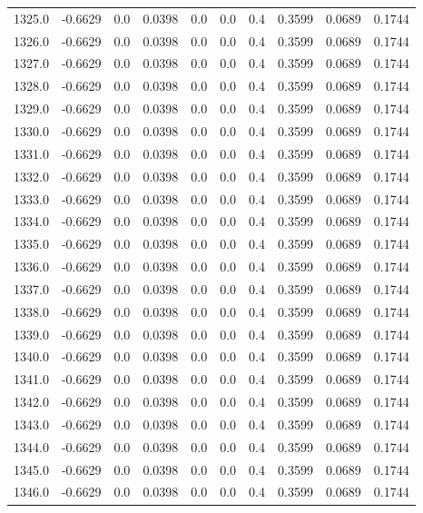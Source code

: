 \begin{longtable}{lrrrrrrrrr}
1325.0 & -0.6629 & 0.0 & 0.0398 & 0.0 & 0.0 & 0.4 & 0.3599 & 0.0689 & 0.1744 \\
1326.0 & -0.6629 & 0.0 & 0.0398 & 0.0 & 0.0 & 0.4 & 0.3599 & 0.0689 & 0.1744 \\
1327.0 & -0.6629 & 0.0 & 0.0398 & 0.0 & 0.0 & 0.4 & 0.3599 & 0.0689 & 0.1744 \\
1328.0 & -0.6629 & 0.0 & 0.0398 & 0.0 & 0.0 & 0.4 & 0.3599 & 0.0689 & 0.1744 \\
1329.0 & -0.6629 & 0.0 & 0.0398 & 0.0 & 0.0 & 0.4 & 0.3599 & 0.0689 & 0.1744 \\
1330.0 & -0.6629 & 0.0 & 0.0398 & 0.0 & 0.0 & 0.4 & 0.3599 & 0.0689 & 0.1744 \\
1331.0 & -0.6629 & 0.0 & 0.0398 & 0.0 & 0.0 & 0.4 & 0.3599 & 0.0689 & 0.1744 \\
1332.0 & -0.6629 & 0.0 & 0.0398 & 0.0 & 0.0 & 0.4 & 0.3599 & 0.0689 & 0.1744 \\
1333.0 & -0.6629 & 0.0 & 0.0398 & 0.0 & 0.0 & 0.4 & 0.3599 & 0.0689 & 0.1744 \\
1334.0 & -0.6629 & 0.0 & 0.0398 & 0.0 & 0.0 & 0.4 & 0.3599 & 0.0689 & 0.1744 \\
1335.0 & -0.6629 & 0.0 & 0.0398 & 0.0 & 0.0 & 0.4 & 0.3599 & 0.0689 & 0.1744 \\
1336.0 & -0.6629 & 0.0 & 0.0398 & 0.0 & 0.0 & 0.4 & 0.3599 & 0.0689 & 0.1744 \\
1337.0 & -0.6629 & 0.0 & 0.0398 & 0.0 & 0.0 & 0.4 & 0.3599 & 0.0689 & 0.1744 \\
1338.0 & -0.6629 & 0.0 & 0.0398 & 0.0 & 0.0 & 0.4 & 0.3599 & 0.0689 & 0.1744 \\
1339.0 & -0.6629 & 0.0 & 0.0398 & 0.0 & 0.0 & 0.4 & 0.3599 & 0.0689 & 0.1744 \\
1340.0 & -0.6629 & 0.0 & 0.0398 & 0.0 & 0.0 & 0.4 & 0.3599 & 0.0689 & 0.1744 \\
1341.0 & -0.6629 & 0.0 & 0.0398 & 0.0 & 0.0 & 0.4 & 0.3599 & 0.0689 & 0.1744 \\
1342.0 & -0.6629 & 0.0 & 0.0398 & 0.0 & 0.0 & 0.4 & 0.3599 & 0.0689 & 0.1744 \\
1343.0 & -0.6629 & 0.0 & 0.0398 & 0.0 & 0.0 & 0.4 & 0.3599 & 0.0689 & 0.1744 \\
1344.0 & -0.6629 & 0.0 & 0.0398 & 0.0 & 0.0 & 0.4 & 0.3599 & 0.0689 & 0.1744 \\
1345.0 & -0.6629 & 0.0 & 0.0398 & 0.0 & 0.0 & 0.4 & 0.3599 & 0.0689 & 0.1744 \\
1346.0 & -0.6629 & 0.0 & 0.0398 & 0.0 & 0.0 & 0.4 & 0.3599 & 0.0689 & 0.1744 \\

\end{longtable}
